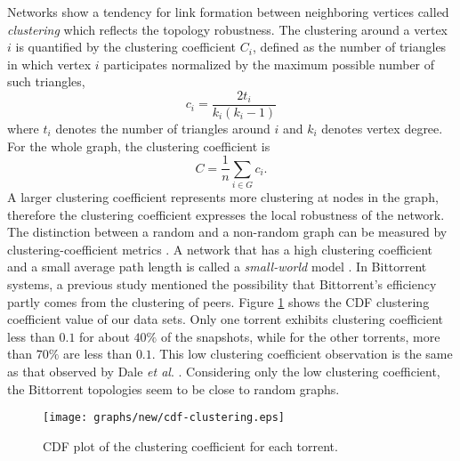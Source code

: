 \documentclass[paper]{ieice}
\begin{document}
Networks show a tendency for link formation between neighboring vertices called \textit{clustering} which reflects the topology robustness.
The clustering around a vertex $i$ is quantified by the clustering coefficient $C_i$, defined as the number of triangles in which vertex $i$ participates normalized by the maximum possible number of such triangles,
\begin{equation}
c_i = \frac{2t_i}{k_i(k_i - 1)} 
\end{equation}
where $t_i$ denotes the number of triangles around $i$ and $k_i$ denotes vertex degree.
For the whole graph, the clustering coefficient is
\begin{equation}
C = \frac{1}{n} \sum_{i \in G} c_i.
\end{equation}
A larger clustering coefficient represents more clustering at nodes in the graph, therefore the clustering coefficient expresses the local robustness of the network.
The distinction between a random and a non-random graph can be measured by clustering-coefficient metrics \cite{watts1998collective}.
A network that has a high clustering coefficient and a small average path length is called a \textit{small-world} model \cite{watts1998collective}.
In Bittorrent systems, a previous study \cite{legout2007clustering} mentioned the possibility that Bittorrent's efficiency partly comes from the clustering of peers.
Figure \ref{fig:cdf-clustering} shows the CDF clustering coefficient value of our data sets.
Only one torrent exhibits clustering coefficient less than $0.1$ for about $40\%$ of the snapshots, while for the other torrents, more than  $70\%$ are less than $0.1$.
This low clustering coefficient observation is the same as that observed by Dale \textit{et al}. \cite{dale2008evolution}.
Considering only the low clustering coefficient, the Bittorrent topologies seem to be close to random graphs.

\begin{figure}[!tb]
\begin{center}
\texttt{[image: graphs/new/cdf-clustering.eps]}
\end{center}
\caption{CDF plot of the clustering coefficient for each torrent.}%
\label{fig:cdf-clustering}
\vspace{-5mm}
\end{figure}
\end{document}
